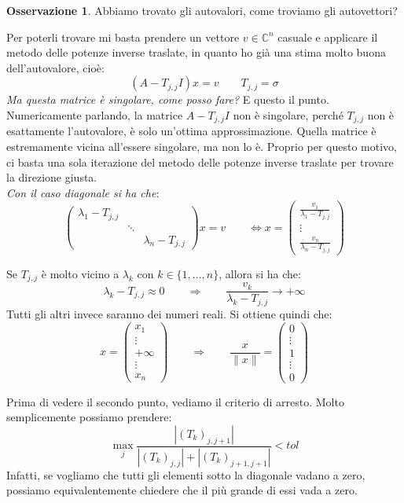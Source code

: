 \documentclass[11pt,a4paper,twoside]{article}
\theoremstyle{definition}
\newtheorem*{oss}{Osservazione}
\begin{document}
\begin{oss}
	Abbiamo trovato gli autovalori, come troviamo gli autovettori?
\end{oss}

Per poterli trovare mi basta prendere un vettore $v \in \mathbb C^n$ casuale e applicare il metodo delle potenze inverse traslate, in quanto ho già una stima molto buona dell'autovalore, cioè:
\[ (A- T_{j,j}I)x = v \qquad T_{j,j} = \sigma\]
\textit{Ma questa matrice è singolare, come posso fare?} E questo il punto. Numericamente parlando, la matrice $A-T_{j,j}I$ non è singolare, perché $T_{j,j}$ non è esattamente l'autovalore, è solo un'ottima approssimazione. Quella matrice è estremamente vicina all'essere singolare, ma non lo è. Proprio per questo motivo, ci basta una sola iterazione del metodo delle potenze inverse traslate per trovare la direzione giusta.\\
\textit{Con il caso diagonale si ha che}:
\[
	\begin{pmatrix}
		\lambda_1 - T_{j,j}\\
		& \ddots\\
		&& \lambda_n - T_{j,j}
	\end{pmatrix} x = v \qquad \Leftrightarrow x =
	\begin{pmatrix}
		\frac{v_1}{\lambda_1 - T_{j,j}}\\
		\vdots\\
		\frac{v_n}{\lambda_n - T_{j,j}}
	\end{pmatrix}
\]

Se $T_{j,j}$ è molto vicino a $\lambda_k$ con $k \in \{1,...,n\}$, allora si ha che:
\[\lambda_k - T_{j,j} \approx 0 \qquad \Rightarrow \qquad \frac{v_k}{\lambda_k - T_{j,j}} \to + \infty\]
Tutti gli altri invece saranno dei numeri reali. Si ottiene quindi che:
\[x = \begin{pmatrix}x_1\\ \vdots \\ +\infty\\ \vdots \\ x_n\end{pmatrix}\qquad \Rightarrow \qquad \frac x{\|x\|} = \begin{pmatrix}0\\ \vdots\\ 1 \\ \vdots \\0\end{pmatrix}\]

Prima di vedere il secondo punto, vediamo il criterio di arresto. Molto semplicemente possiamo prendere:
\[ \max_j \frac{|(T_k)_{j,j+1}|}{|(T_k)_{j,j}| + |(T_k)_{j+1, j+1}|}<tol\]
Infatti, se vogliamo che tutti gli elementi sotto la diagonale vadano a zero, possiamo equivalentemente chiedere che il più grande di essi vada a zero.
\end{document}
